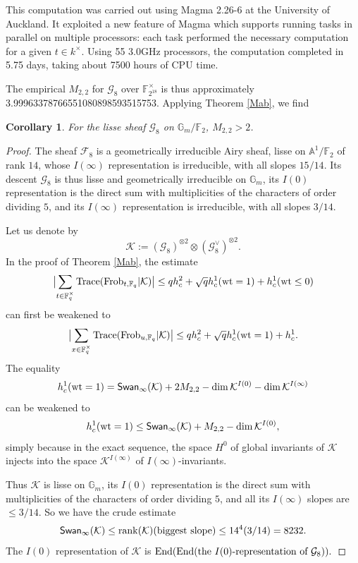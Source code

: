 \documentclass[11pt]{amsart}
\theoremstyle{plain}
\newtheorem{cor}[thm]{Corollary}
\theoremstyle{definition}
\numberwithin{thm}{section}
\numberwithin{equation}{thm}
\newcommand{\rank}{{\rm rank}}
\newcommand{\End}{{\rm End}}
\newcommand{\Trace}{{\rm Trace}}
\newcommand{\Swan}{\mathsf {Swan}}
\newcommand{\sF}{{\mathcal F}}
\newcommand{\sG}{{\mathcal G}}
\newcommand{\sK}{{\mathcal K}}
\newcommand{\A}{{\mathbb A}}
\newcommand{\F}{{\mathbb F}}
\newcommand{\G}{{\mathbb G}}
\newcommand{\0}{\emptyset}
\newcommand{\Frob}{\mathrm{Frob}}
\begin{document}
This computation was carried out using {\sc Magma} 2.26-6 \cite{Magma} at
the University of Auckland. It exploited a new feature of {\sc Magma}
which supports running tasks in parallel on multiple processors:
each task performed the necessary computation
for a given $t \in k^\times$.
Using 55 3.0GHz processors, the computation
completed in 5.75 days, taking about 7500 hours of CPU time.

The empirical $M_{2,2}$ for $\sG_8$ over $\F_{2^{18}}^\times$ is thus  approximately 3.99963378766551080898593515753.
Applying Theorem \ref{Mab}, we find
\begin{cor}\label{m4}
For the lisse sheaf $\sG_8$ on $\G_m/\F_2$, $M_{2,2} >2$.
\end{cor}
\begin{proof}The sheaf $\sF_8$ is a geometrically irreducible Airy sheaf, lisse on $\A^1/\F_2$ of rank $14$, whose $I(\infty)$ representation is
irreducible, with all slopes $15/14$. Its descent $\sG_8$ is thus lisse and geometrically irreducible on $\G_m$, its $I(0)$ representation is the direct sum with multiplicities of the characters of order dividing $5$, and its $I(\infty)$ representation is irreducible, with all slopes $3/14$.

Let us denote by 
$$\sK :=(\sG_8)^{\otimes 2}\otimes (\sG_8^\vee)^{\otimes 2}.$$
In the proof of Theorem \ref{Mab}, the estimate
$$\bigl{|}\sum_{t \in \F_q^\times}\Trace(\Frob_{t,\F_q}|\sK) \bigr{|}  \le qh^2_c + \sqrt{q}h^1_c({\rm {wt}}=1) +h^1_c{(\rm {wt}} \le 0)$$
can first be weakened to 
$$\bigl{|}\sum_{x \in \F_q^\times}\Trace(\Frob_{u,\F_q}|\sK) \bigr{|}  \le qh^2_c + \sqrt{q}h^1_c({\rm {wt}}=1) +h^1_c.$$
The equality  
$$h^1_c({\rm {wt}}=1)=\Swan_{\infty}(\sK) +2M_{2,2}-\dim \sK^{I(0)} -\dim \sK^{I(\infty)} $$
can be weakened to 
$$h^1_c({\rm {wt}}=1) \le \Swan_\infty(\sK) +M_{2,2}-\dim \sK^{I(0)} ,$$
simply because in the exact sequence, the space $H^0$ of global invariants of $\sK$ injects into the space $\sK^{I(\infty)}$ of $I(\infty)$-invariants.

Thus $\sK$ is lisse on $\G_m$, its $I(0)$ representation is the direct sum with multiplicities of the characters of order dividing $5$, and all its
 $I(\infty)$ slopes are $\le 3/14.$ So we have the crude estimate
 $$\Swan_\infty(\sK) \le \rank(\sK)({\rm biggest\ slope}) \le 14^4(3/14) =8232.$$
 The $I(0)$ representation of $\sK$ is $\End(\End(\mbox{the }I(0)\mbox{-representation\ of\ }\sG_8)).$
 

\end{proof}
\end{document}
